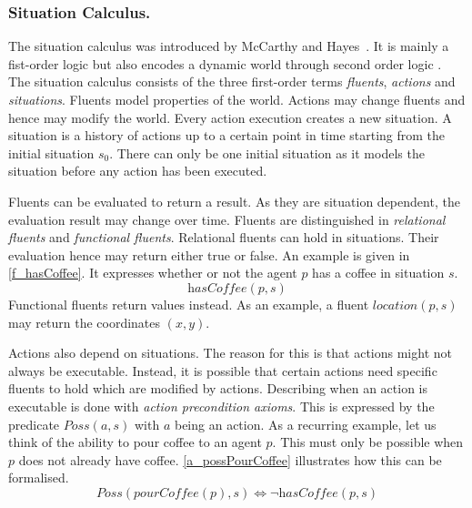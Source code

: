 \subsubsection{Situation Calculus.}\label{fun:apl_sitCalc}
The situation calculus was introduced by McCarthy and Hayes~\cite{mccarthy_philosophical_1969}. It is mainly a fist-order logic but also encodes a dynamic world through second order logic \cite{levesque_golog:_1997}. The situation calculus consists of the three first-order terms \emph{fluents}, \emph{actions} and \emph{situations}. Fluents model properties of the world. Actions may change fluents and hence may modify the world. Every action execution creates a new situation. A situation is a history of actions up to a certain point in time starting from the initial situation $s_0$. There can only be one initial situation as it models the situation before any action has been executed.

Fluents can be evaluated to return a result. As they are situation dependent, the evaluation result may change over time. Fluents are distinguished in \emph{relational fluents} and \emph{functional fluents}. Relational fluents can hold in situations. Their evaluation hence may return either true or false. An example is given in \autoref{f_hasCoffee}. It expresses whether or not the agent $p$ has a coffee in situation $s$.
\begin{equation}\label{f_hasCoffee}
  \textit{hasCoffee}(p,s)
\end{equation}
Functional fluents return values instead. As an example, a fluent $\textit{location}(p,s)$ may return the coordinates $(x,y)$.

Actions also depend on situations. The reason for this is that actions might not always be executable. Instead, it is possible that certain actions need specific fluents to hold which are modified by actions. Describing when an action is executable is done with \emph{action precondition axioms}. This is expressed by the predicate $\textit{Poss}(a,s)$ with $a$ being an action. As a recurring example, let us think of the ability to pour coffee to an agent $p$. This must only be possible when $p$ does not already have coffee. \autoref{a_possPourCoffee} illustrates how this can be formalised.
\begin{equation}\label{a_possPourCoffee}
  \textit{Poss}(\textit{pourCoffee}(p),s) \Leftrightarrow \neg \textit{hasCoffee}(p,s)
\end{equation}

